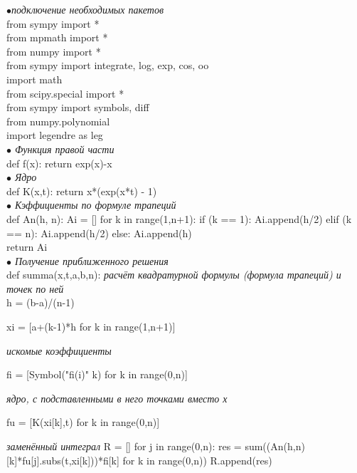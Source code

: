 \documentclass[12pt]{article}
\begin{document}
\textit{$ \bullet $подключение необходимых пакетов}\\
from sympy import *\\
from mpmath import *\\
from numpy import *\\
from sympy import integrate, log, exp, cos, oo\\
import math\\
from scipy.special import *\\
from sympy import symbols, diff\\
from numpy.polynomial\\
import legendre as leg\\

\textit{ $ \bullet $   Функция правой части}\\
def f(x):\vskip 0.3cm return exp(x)-x\\
 
 \textit{$ \bullet $ Ядро}\\
 def K(x,t):\vskip 0.3cm return x*(exp(x*t) - 1)\\
 
 \textit{$ \bullet $   Кэффициенты по формуле трапеций}\\
 def An(h, n): \vskip 0.3cm Ai = [] \vskip 0.3cm for k in range(1,n+1): \vskip 0.3cm if (k == 1): \vskip 0.3cm Ai.append(h/2) \vskip 0.3cm elif (k == n): \vskip 0.3cm Ai.append(h/2) \vskip 0.3cm else: \vskip 0.3cm Ai.append(h)\\
 
 return Ai\\
 
 \textit{$ \bullet $                                            Получение приближенного решения}\\
 def summa(x,t,a,b,n): \vskip 0.3cm
\textit{ расчёт квадратурной формулы (формула трапеций) и точек по ней}\\

 h = (b-a)/(n-1) \vskip 0.3cm
 
 xi = [a+(k-1)*h for k in range(1,n+1)]
 
\textit{ искомые коэффициенты} \vskip 0.3cm
 
 fi = [Symbol("fi(i)" k) for k in range(0,n)]  \vskip 0.3cm
 
\textit{ ядро, с подставленными в него точками вместо х  } \vskip 0.3cm
 
 fu = [K(xi[k],t) for k in range(0,n)] \vskip 0.3cm
 
\textit{ заменённый интеграл} \vskip 0.3cm
 R = [] \vskip 0.3cm
 for j in range(0,n): \vskip 0.3cm
 res  = sum((An(h,n)[k]*fu[j].subs(t,xi[k]))*fi[k] for k in range(0,n)) \vskip 0.3cm
 R.append(res) \vskip 0.3cm
 
\end{document}
